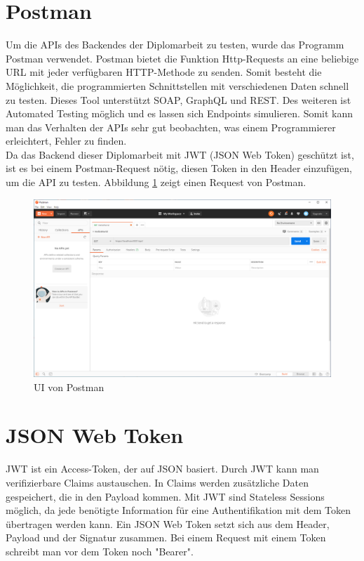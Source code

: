 \section{Postman}
Um die APIs des Backendes der Diplomarbeit zu testen, wurde das Programm Postman verwendet. Postman bietet die Funktion Http-Requests an eine beliebige URL mit jeder verfügbaren HTTP-Methode zu senden. Somit besteht die Möglichkeit, die programmierten Schnittstellen mit verschiedenen Daten schnell zu testen. Dieses Tool unterstützt SOAP, GraphQL und REST. Des weiteren ist Automated Testing möglich und es lassen sich Endpoints simulieren. Somit kann man das Verhalten der APIs sehr gut beobachten, was einem Programmierer erleichtert, Fehler zu finden. \autocite{postmanDocs} \\
Da das Backend dieser Diplomarbeit mit JWT (JSON Web Token) geschützt ist, ist es bei einem Postman-Request nötig, diesen Token in den Header einzufügen, um die API zu testen.  \newpage
Abbildung \ref{fig:postman} zeigt einen Request von Postman.
\begin{figure}[H]
	\centerline{
		\includegraphics[width=1\textwidth, frame]{./grafiken/postman.png}
	}
	\vskip0pt
	\caption{UI von Postman} \label{fig:postman}
\end{figure}


\section{JSON Web Token}
JWT ist ein Access-Token, der auf JSON basiert. Durch JWT kann man verifizierbare Claims austauschen. In Claims werden zusätzliche Daten gespeichert, die in den Payload kommen. Mit JWT sind Stateless Sessions möglich, da jede benötigte Information für eine Authentifikation mit dem Token übertragen werden kann. Ein JSON Web Token setzt sich aus dem Header, Payload und der Signatur zusammen. Bei einem Request mit einem Token schreibt man vor dem Token noch "Bearer". \autocite{wikiJWT}

